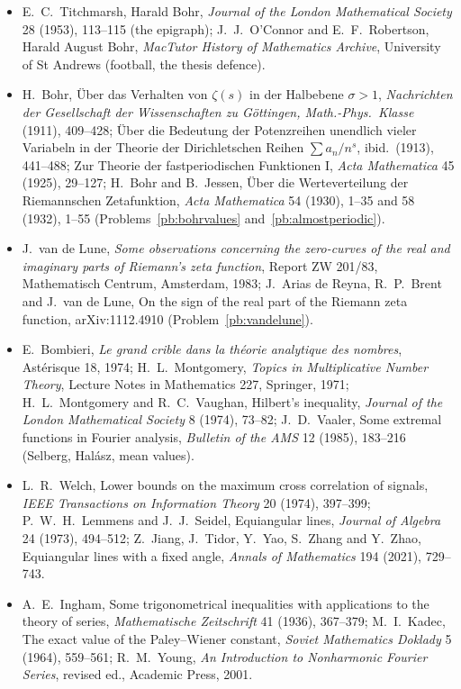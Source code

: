 \begin{itemize}
\item E.~C.~Titchmarsh, Harald Bohr, \emph{Journal of the London Mathematical Society} 28 (1953), 113--115 (the epigraph); J.~J.~O'Connor and E.~F.~Robertson, Harald August Bohr,
\emph{MacTutor History of Mathematics Archive}, University of St Andrews (football, the thesis defence).
\item H.~Bohr, Über das Verhalten von $\zeta(s)$ in der Halbebene $\sigma>1$, \emph{Nachrichten der Gesellschaft der Wissenschaften zu Göttingen, Math.-Phys.\ Klasse} (1911), 409--428;
Über die Bedeutung der Potenzreihen unendlich vieler Variabeln in der Theorie der Dirichletschen Reihen $\sum a_n/n^s$, ibid.\ (1913), 441--488; Zur Theorie der fastperiodischen
Funktionen I, \emph{Acta Mathematica} 45 (1925), 29--127; H.~Bohr and B.~Jessen, Über die Werteverteilung der Riemannschen Zetafunktion, \emph{Acta Mathematica} 54 (1930), 1--35
and 58 (1932), 1--55 (Problems~\ref{pb:bohrvalues} and~\ref{pb:almostperiodic}).
\item J.~van de Lune, \emph{Some observations concerning the zero-curves of the real and imaginary parts of Riemann's zeta function}, Report ZW 201/83, Mathematisch Centrum,
Amsterdam, 1983; J.~Arias de Reyna, R.~P.~Brent and J.~van de Lune, On the sign of the real part of the Riemann zeta function, arXiv:1112.4910 (Problem~\ref{pb:vandelune}).
\item E.~Bombieri, \emph{Le grand crible dans la théorie analytique des nombres}, Astérisque 18, 1974; H.~L.~Montgomery, \emph{Topics in Multiplicative Number Theory}, Lecture
Notes in Mathematics 227, Springer, 1971; H.~L.~Montgomery and R.~C.~Vaughan, Hilbert's inequality, \emph{Journal of the London Mathematical Society} 8 (1974), 73--82; J.~D.~Vaaler,
Some extremal functions in Fourier analysis, \emph{Bulletin of the AMS} 12 (1985), 183--216 (Selberg, Halász, mean values).
\item L.~R.~Welch, Lower bounds on the maximum cross correlation of signals, \emph{IEEE Transactions on Information Theory} 20 (1974), 397--399; P.~W.~H.~Lemmens and J.~J.~Seidel,
Equiangular lines, \emph{Journal of Algebra} 24 (1973), 494--512; Z.~Jiang, J.~Tidor, Y.~Yao, S.~Zhang and Y.~Zhao, Equiangular lines with a fixed angle, \emph{Annals of Mathematics}
194 (2021), 729--743.
\item A.~E.~Ingham, Some trigonometrical inequalities with applications to the theory of series, \emph{Mathematische Zeitschrift} 41 (1936), 367--379; M.~I.~Kadec, The exact value of
the Paley--Wiener constant, \emph{Soviet Mathematics Doklady} 5 (1964), 559--561; R.~M.~Young, \emph{An Introduction to Nonharmonic Fourier Series}, revised ed., Academic Press, 2001.

\end{itemize}
